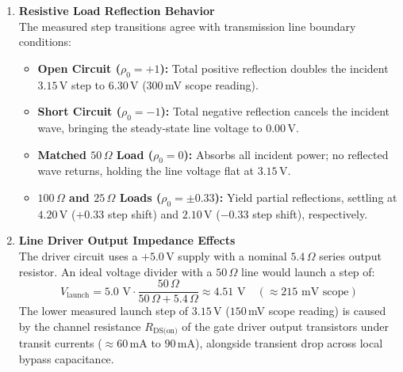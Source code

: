 \begin{enumerate}
    \item \textbf{Resistive Load Reflection Behavior} \\
    The measured step transitions agree with transmission line boundary conditions:
    \begin{itemize}
        \item \textbf{Open Circuit ($\rho_0 = +1$):} Total positive reflection doubles the incident $3.15$\,V step to $6.30$\,V ($300$\,mV scope reading).
        \item \textbf{Short Circuit ($\rho_0 = -1$):} Total negative reflection cancels the incident wave, bringing the steady-state line voltage to $0.00$\,V.
        \item \textbf{Matched $50\,\Omega$ Load ($\rho_0 = 0$):} Absorbs all incident power; no reflected wave returns, holding the line voltage flat at $3.15$\,V.
        \item \textbf{$100\,\Omega$ and $25\,\Omega$ Loads ($\rho_0 = \pm 0.33$):} Yield partial reflections, settling at $4.20$\,V ($+0.33$ step shift) and $2.10$\,V ($-0.33$ step shift), respectively.
    \end{itemize}

    \item \textbf{Line Driver Output Impedance Effects} \\
    The driver circuit uses a $+5.0$\,V supply with a nominal $5.4\,\Omega$ series output resistor. An ideal voltage divider with a $50\,\Omega$ line would launch a step of:
    \begin{equation}
        V_{\text{launch}} = 5.0\text{ V} \cdot \frac{50\,\Omega}{50\,\Omega + 5.4\,\Omega} \approx 4.51\text{ V} \quad (\approx 215\text{ mV scope})
    \end{equation}
    The lower measured launch step of $3.15$\,V ($150$\,mV scope reading) is caused by the channel resistance $R_{\text{DS(on)}}$ of the gate driver output transistors under transit currents ($\approx 60$\,mA to $90$\,mA), alongside transient drop across local bypass capacitance.


\end{enumerate}
